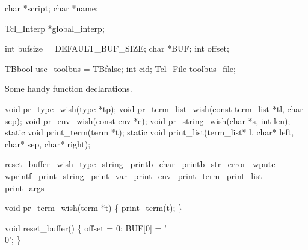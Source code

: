 char *script;
char *name;

Tcl_Interp *global_interp;

int bufsize = DEFAULT_BUF_SIZE;
char *BUF;
int offset;

TBbool use_toolbus = TBfalse;
int cid;
Tcl_File toolbus_file;
\nwendcode{}\nwdocspar


Some handy function declarations.

\nwenddocs{}\endmoddef\let\nwnotused=\nwoutput{}
void pr_type_wish(type *tp);
void pr_term_list_wish(const term_list *tl, char sep);
void pr_env_wish(const env *e);
void pr_string_wish(char *s, int len);
static void print_term(term *t);
static void print_list(term_list* l, char* left, char* sep, char* right);
\nwendcode{}\nwdocspar



\nwenddocs{}\endmoddef
\LA{}reset_buffer~{\nwtagstyle{}}\RA{}
\LA{}wish_type_string~{\nwtagstyle{}}\RA{}
\LA{}printb_char~{\nwtagstyle{}}\RA{}
\LA{}printb_str~{\nwtagstyle{}}\RA{}
\LA{}error~{\nwtagstyle{}}\RA{}
\LA{}wputc~{\nwtagstyle{}}\RA{}
\LA{}wprintf~{\nwtagstyle{}}\RA{}
\LA{}print_string~{\nwtagstyle{}}\RA{}
\LA{}print_var~{\nwtagstyle{}}\RA{}
\LA{}print_env~{\nwtagstyle{}}\RA{}
\LA{}print_term~{\nwtagstyle{}}\RA{}
\LA{}print_list~{\nwtagstyle{}}\RA{}
\LA{}print_args~{\nwtagstyle{}}\RA{}

void pr_term_wish(term *t)
\{
  print_term(t);
\}
\nwendcode{}\nwdocspar


\nwenddocs{}\endmoddef\let\nwnotused=\nwoutput{}
void reset_buffer()
\{
  offset = 0;
  BUF[0] = '\\0';
\}
\nwendcode{}\nwdocspar

